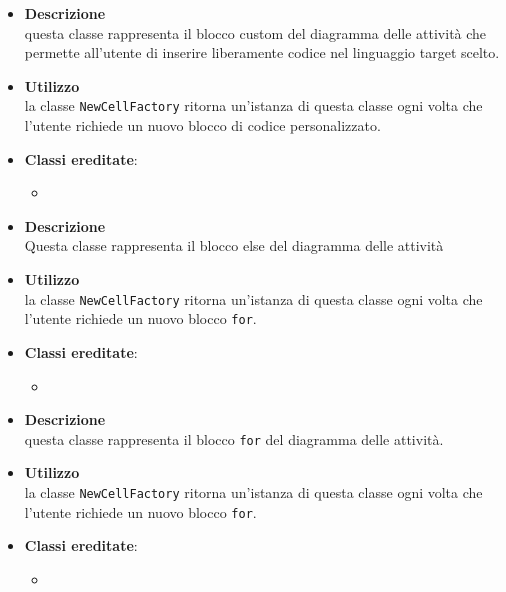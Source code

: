 \label{\nogloxy{swedesigner::client::model::celltypes::activity::HxCustom}}
\begin{itemize}
\item \textbf{Descrizione}\\
questa classe rappresenta il blocco custom del diagramma delle attività che permette all'utente di inserire liberamente codice nel linguaggio target scelto.
\item \textbf{Utilizzo}\\
la classe \texttt{NewCellFactory} ritorna un'istanza di questa classe ogni volta che l'utente richiede un nuovo blocco di codice personalizzato.
\item \textbf{Classi ereditate}:
\begin{itemize}
\item \hyperref[\nogloxy{swedesigner::client::model::celltypes::activity::ActivityDiagramElement}]{}
\end{itemize}
\end{itemize}

\label{\nogloxy{swedesigner::client::model::celltypes::activity::HxElse}}
\begin{itemize}
\item \textbf{Descrizione}\\
Questa classe rappresenta il blocco else del diagramma delle attività
\item \textbf{Utilizzo}\\
la classe \texttt{NewCellFactory} ritorna un'istanza di questa classe ogni volta che l'utente richiede un nuovo blocco \texttt{for}.
\item \textbf{Classi ereditate}:
\begin{itemize}
\item \hyperref[\nogloxy{swedesigner::client::model::celltypes::activity::ActivityDiagramElement}]{}
\end{itemize}
\end{itemize}

\label{\nogloxy{swedesigner::client::model::celltypes::activity::HxFor}}
\begin{itemize}
\item \textbf{Descrizione}\\
questa classe rappresenta il blocco \texttt{for} del diagramma delle attività.
\item \textbf{Utilizzo}\\
la classe \texttt{NewCellFactory} ritorna un'istanza di questa classe ogni volta che l'utente richiede un nuovo blocco \texttt{for}.
\item \textbf{Classi ereditate}:
\begin{itemize}
\item \hyperref[\nogloxy{swedesigner::client::model::celltypes::activity::ActivityDiagramElement}]{}
\end{itemize}
\end{itemize}

